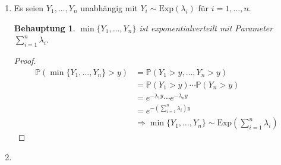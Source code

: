 \documentclass[a4paper]{scrartcl}
\newtheorem*{behaupt}{Behauptung}
\newcommand{\prob}{\mathbb{P}}
\def \blattnr {4}
\begin{document}
\begin{enumerate}[label=\bfseries \blattnr.\arabic*]
\begin{enumerate}
            \item
                Es seien $Y_1, \dotsc, Y_n$ unabhängig mit $Y_i \sim
                \text{Exp}(\lambda_i)$ für $i = 1, \dotsc, n$.
                \begin{behaupt}
                    $\min\{Y_1, \dotsc, Y_n\}$ ist exponentialverteilt mit
                    Parameter $\sum_{i=1}^n \lambda_i$.
                \end{behaupt}
                \begin{proof}
                    \begin{equation*}
                        \begin{split}
                            \prob(\min\{Y_1, \dotsc, Y_n\} > y)
                            &= \prob(Y_1 > y, \dotsc, Y_n > y) \\
                            &= \prob(Y_1 > y) \dotsm \prob(Y_n > y) \\
                            &= e^{-\lambda_1 y} \dotsm e^{-\lambda_n y} \\
                            &= e^{- \left( \sum_{i=1}^n \lambda_i \right) y} \\
                            &\Rightarrow \min\{Y_1, \dotsc, Y_n\} \sim
                            \text{Exp} \left( \sum_{i=1}^n \lambda_i \right)
                        \end{split}
                    \end{equation*}
                \end{proof}

            \item

        \end{enumerate}
   
\end{enumerate}
\end{document}
